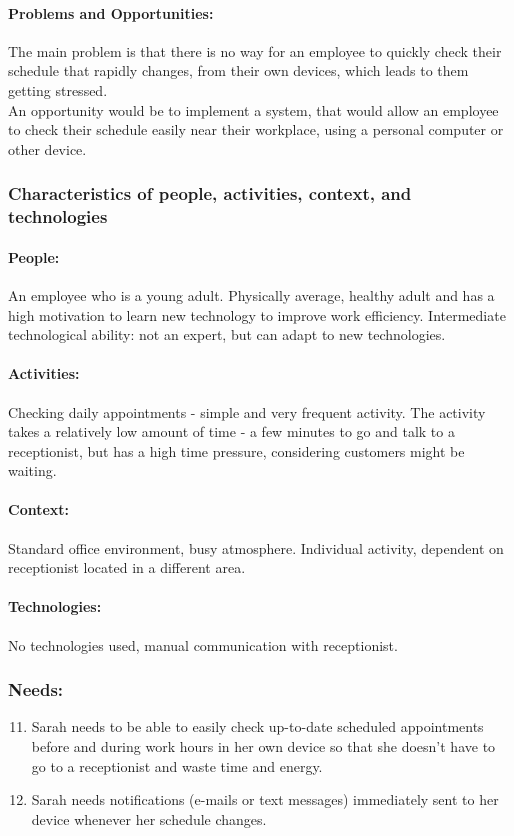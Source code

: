 \documentclass{article}
\begin{document}
\paragraph{\small Problems and Opportunities:} The main problem is that there is no way for an employee to quickly check their schedule that rapidly changes, from their own devices, which leads to them getting stressed.\\ An opportunity would be to implement a system, that would allow an employee to check their schedule easily near their workplace, using a personal computer or other device.

\subsubsection{Characteristics of people, activities, context, and technologies}
\paragraph{\small People:}  An employee who is a young adult. Physically average, healthy adult and has a high motivation to learn new technology to improve work efficiency. Intermediate technological ability: not an expert, but can adapt to new technologies.
\paragraph{\small Activities:} Checking daily appointments - simple and very frequent activity. The activity takes a relatively low amount of time - a few minutes to go and talk to a receptionist, but has a high time pressure, considering customers might be waiting.
\paragraph{\small Context:} Standard office environment, busy atmosphere. Individual activity, dependent on receptionist located in a different area.
\paragraph{\small Technologies:} No technologies used, manual communication with receptionist.

\subsubsection{Needs:}
\begin{enumerate}[label=N\arabic*.]
\setcounter{enumi}{10}
\item Sarah needs to be able to easily check up-to-date scheduled appointments before and during work hours in her own device so that she doesn't have to go to a receptionist and waste time and energy.
\item Sarah needs notifications (e-mails or text messages) immediately sent to her device whenever her schedule changes.
\end{enumerate}
\end{document}

